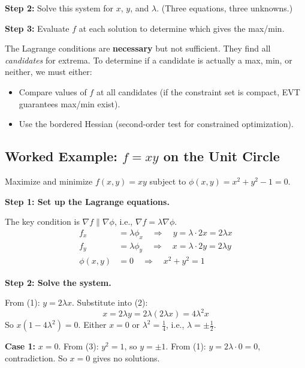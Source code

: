 \documentclass[11pt]{report}
\begin{document}
\textbf{Step 2:} Solve this system for $x$, $y$, and $\lambda$. (Three equations, three unknowns.)

\textbf{Step 3:} Evaluate $f$ at each solution to determine which gives the max/min.

\begin{remark}
The Lagrange conditions are \textbf{necessary} but not sufficient. They find all \emph{candidates} for extrema. To determine if a candidate is actually a max, min, or neither, we must either:
\begin{itemize}
    \item Compare values of $f$ at all candidates (if the constraint set is compact, EVT guarantees max/min exist).
    \item Use the bordered Hessian (second-order test for constrained optimization).
\end{itemize}
\end{remark}

\subsection*{Worked Example: $f = xy$ on the Unit Circle}

\begin{example}
Maximize and minimize $f(x, y) = xy$ subject to $\phi(x, y) = x^2 + y^2 - 1 = 0$.
\end{example}

\textbf{Step 1: Set up the Lagrange equations.}

The key condition is $\nabla f \parallel \nabla \phi$, i.e., $\nabla f = \lambda \nabla \phi$.
\begin{align*}
f_x &= \lambda \phi_x \quad \Rightarrow \quad y = \lambda \cdot 2x = 2\lambda x \tag{1} \\
f_y &= \lambda \phi_y \quad \Rightarrow \quad x = \lambda \cdot 2y = 2\lambda y \tag{2} \\
\phi(x,y) &= 0 \quad \Rightarrow \quad x^2 + y^2 = 1 \tag{3}
\end{align*}

\textbf{Step 2: Solve the system.}

From (1): $y = 2\lambda x$. Substitute into (2):
\[
x = 2\lambda y = 2\lambda(2\lambda x) = 4\lambda^2 x
\]
So $x(1 - 4\lambda^2) = 0$. Either $x = 0$ or $\lambda^2 = \frac{1}{4}$, i.e., $\lambda = \pm\frac{1}{2}$.

\textbf{Case 1:} $x = 0$. From (3): $y^2 = 1$, so $y = \pm 1$. From (1): $y = 2\lambda \cdot 0 = 0$, contradiction. So $x = 0$ gives no solutions.
\end{document}
